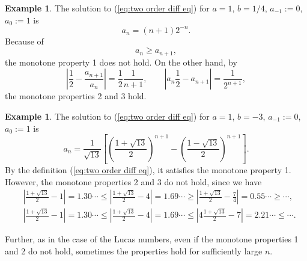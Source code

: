 \documentclass[a4paper,11pt,reqno]{amsart}
\theoremstyle{plain}
\theoremstyle{definition}
\newtheorem{exa}[thm]{Example}
\begin{document}
\begin{exa}
\label{exa:count exam1}
The solution to (\ref{eq:two order diff eq}) 
for $a=1$, $b=1/4$, $a_{-1}:=0$, $a_{0}:=1$
is
$$
a_{n}=(n+1)2^{-n} .
$$
Because of 
$$
a_{n}\geq a_{n+1}, 
$$
the monotone property 1 does not hold. 
On the other hand, by 
$$
\left|\frac{1}{2}-\frac{a_{n+1}}{a_{n}}\right|
   =
   \frac{1}{2}\frac{1}{n+1} ,\qquad 
\left|a_{n}\frac{1}{2}-a_{n+1}\right|
   =
   \frac{1}{2^{n+1}} ,
$$
the monotone properties 2 and 3 hold. 
\end{exa}

\begin{exa}
The solution to (\ref{eq:two order diff eq})
for $a=1$, $b=-3$, $a_{-1}:=0$, $a_{0}:=1$
is
$$
a_{n}
   =
   \frac{1}{\sqrt{13}}\left[\left(\frac{1+\sqrt{13}}{2}\right)^{n+1}-\left(\frac{1-\sqrt{13}}{2}\right)^{n+1}\right].
$$
By the definition (\ref{eq:two order diff eq}), it satisfies the monotone property 1. 
However, the monotone properties 2 and 3 do not hold, since we have
\begin{align*}
&\left|\frac{1+\sqrt{13}}{2}-1\right|=1.30\cdots 
   \leq \left|\frac{1+\sqrt{13}}{2}-4\right|=1.69\cdots 
   \geq \left|\frac{1+\sqrt{13}}{2}-\frac{7}{4}\right|=0.55\cdots
   \geq \cdots ,
\\
&\left|\frac{1+\sqrt{13}}{2}-1\right|=1.30\cdots 
   \leq \left|\frac{1+\sqrt{13}}{2}-4\right|=1.69\cdots 
   \leq \left|4\frac{1+\sqrt{13}}{2}-7\right|=2.21\cdots 
   \leq \cdots .  
\end{align*}
\end{exa}

Further, as in the case of the Lucas numbers, even if the monotone properties 1 and 2 
do not hold, sometimes the properties hold for sufficiently large $n$. 
\end{document}

